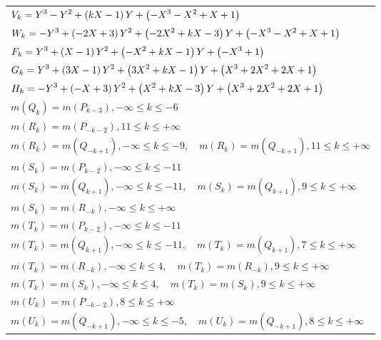\documentclass{amsart}
\begin{document}
\begin{longtable}{|l|}
\(\displaystyle V_k=Y^3
 - Y^2
 + \left(k\*X
 - 1\right) \*Y
 + \left(-X^3
 - X^2
 + X
 + 1\right) \)\\
\(\displaystyle W_k=-Y^3
 + \left(-2\*X
 + 3\right) \*Y^2
 + \left(-2\*X^2
 + k\*X
 - 3\right) \*Y
 + \left(-X^3
 - X^2
 + X
 + 1\right) \)\\
\(\displaystyle F_k=Y^3
 + \left(X
 - 1\right) \*Y^2
 + \left(-X^2
 + k\*X
 - 1\right) \*Y
 + \left(-X^3
 + 1\right) \)\\
\(\displaystyle G_k=Y^3
 + \left(3\*X
 - 1\right) \*Y^2
 + \left(3\*X^2
 + k\*X
 - 1\right) \*Y
 + \left(X^3
 + 2\*X^2
 + 2\*X
 + 1\right) \)\\
\(\displaystyle H_k=-Y^3
 + \left(-X
 + 3\right) \*Y^2
 + \left(X^2
 + k\*X
 - 3\right) \*Y
 + \left(X^3
 + 2\*X^2
 + 2\*X
 + 1\right) \)\\
\(\displaystyle m(Q_k) = m(P_{k
 - 3}),-\infty \leqslant k \leqslant -6\)\\
\(\displaystyle m(R_k) = m(P_{-k
 - 2}),11 \leqslant k \leqslant +\infty\)\\
\(\displaystyle m(R_k) = m(Q_{-k
 + 1}),-\infty \leqslant k \leqslant -9,\quad m(R_k) = m(Q_{-k
 + 1}),11 \leqslant k \leqslant +\infty\)\\
\(\displaystyle m(S_k) = m(P_{k
 - 2}),-\infty \leqslant k \leqslant -11\)\\
\(\displaystyle m(S_k) = m(Q_{k
 + 1}),-\infty \leqslant k \leqslant -11,\quad m(S_k) = m(Q_{k
 + 1}),9 \leqslant k \leqslant +\infty\)\\
\(\displaystyle m(S_k) = m(R_{-k}),-\infty \leqslant k \leqslant +\infty\)\\
\(\displaystyle m(T_k) = m(P_{k
 - 2}),-\infty \leqslant k \leqslant -11\)\\
\(\displaystyle m(T_k) = m(Q_{k
 + 1}),-\infty \leqslant k \leqslant -11,\quad m(T_k) = m(Q_{k
 + 1}),7 \leqslant k \leqslant +\infty\)\\
\(\displaystyle m(T_k) = m(R_{-k}),-\infty \leqslant k \leqslant 4,\quad m(T_k) = m(R_{-k}),9 \leqslant k \leqslant +\infty\)\\
\(\displaystyle m(T_k) = m(S_{k}),-\infty \leqslant k \leqslant 4,\quad m(T_k) = m(S_{k}),9 \leqslant k \leqslant +\infty\)\\
\(\displaystyle m(U_k) = m(P_{-k
 - 2}),8 \leqslant k \leqslant +\infty\)\\
\(\displaystyle m(U_k) = m(Q_{-k
 + 1}),-\infty \leqslant k \leqslant -5,\quad m(U_k) = m(Q_{-k
 + 1}),8 \leqslant k \leqslant +\infty\)\\

\end{longtable}
\end{document}
